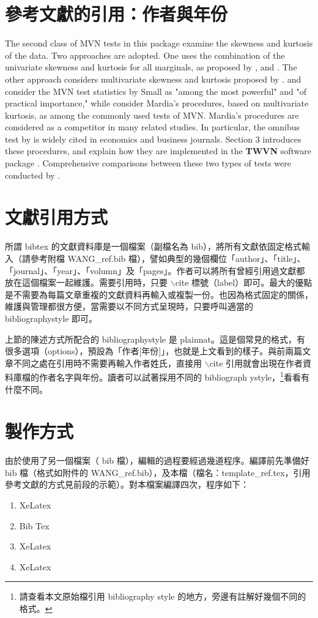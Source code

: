\section{參考文獻的引用：作者與年份}
{\T The second class of MVN tests in this package examine the skewness and kurtosis of the data. Two approaches are adopted. One uses the combination of the univariate skewness and kurtosis for all marginals, as proposed by \cite{SMALL:1980}, and \cite{DOORNIK:2008}. The other approach considers multivariate skewness and kurtosis proposed by \cite{MARDIA:1970}.   \cite{FOSTER:1981} and \cite{HORSWELL:1990} consider the MVN test statistics by Small as "among the most powerful" and "of practical importance,"  while \cite{MM} consider Mardia's procedures, based on multivariate kurtosis, as among the commonly used tests of MVN.  Mardia's procedures are considered as a competitor  in many related studies.
In particular, the omnibus test by \cite{DOORNIK:2008} is widely cited in economics and business journals. Section 3 introduces these procedures, and explain how they are implemented in the \textbf{TWVN} software package \cite{WH}. Comprehensive  comparisons between these two types of tests were conducted by \cite{HORSWELL:1992}.}

\section{文獻引用方式}
所謂 bibtex 的文獻資料庫是一個檔案（副檔名為 bib），將所有文獻依固定格式輸入（請參考附檔 WANG\_ref.bib 檔），譬如典型的幾個欄位「author」、「title」、「journal」、「year」、「volumn」及「pages」。作者可以將所有曾經引用過文獻都放在這個檔案一起維護。需要引用時，只要 $\backslash$cite 標號（label）即可。最大的優點是不需要為每篇文章重複的文獻資料再輸入或複製一份。也因為格式固定的關係，維護與管理都很方便，當需要以不同方式呈現時，只要呼叫適當的 bibliographystyle 即可。

上節的陳述方式所配合的 bibliographystyle 是 {\E plainnat}。這是個常見的格式，有很多選項（options），預設為「作者[年份]」，也就是上文看到的樣子。與前兩篇文章不同之處在引用時不需要再輸入作者姓氏，直接用 $\backslash$cite 引用就會出現在作者資料庫檔的作者名字與年份。讀者可以試著採用不同的 bibliograph ystyle，\footnote{請查看本文原始檔引用 bibliography style 的地方，旁邊有註解好幾個不同的格式。}看看有什麼不同。

\section{製作方式}
由於使用了另一個檔案（ bib 檔），編輯的過程要經過幾道程序。編譯前先準備好 bib 檔（格式如附件的 {\T WANG\_ref.bib}），及本檔（檔名：{\T template\_ref.tex}，引用參考文獻的方式見前段的示範）。對本檔案編譯四次，程序如下：
{\E 
\begin{enumerate}
\item XeLatex
\item Bib Tex
\item XeLatex
\item XeLatex
\end{enumerate}
}

